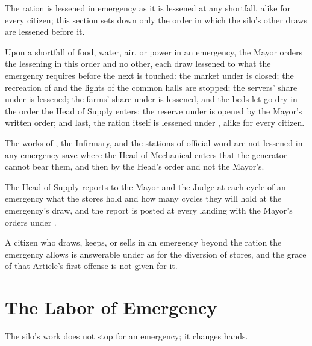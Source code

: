 The ration is lessened in emergency as it is lessened at any shortfall, alike for every citizen; this section sets down only the order in which the silo's other draws are lessened before it.

\begin{clauses}
\item Upon a shortfall of food, water, air, or power in an emergency, the Mayor orders the lessening in this order and no other, each draw lessened to what the emergency requires before the next is touched: the market under  is closed; the recreation of  and the lights of the common halls are stopped; the servers' share under  is lessened; the farms' share under  is lessened, and the beds let go dry in the order the Head of Supply enters; the reserve under  is opened by the Mayor's written order; and last, the ration itself is lessened under , alike for every citizen.
\item The works of , the Infirmary, and the stations of official word are not lessened in any emergency save where the Head of Mechanical enters that the generator cannot bear them, and then by the Head's order and not the Mayor's.
\item The Head of Supply reports to the Mayor and the Judge at each cycle of an emergency what the stores hold and how many cycles they will hold at the emergency's draw, and the report is posted at every landing with the Mayor's orders under .
\item A citizen who draws, keeps, or sells in an emergency beyond the ration the emergency allows is answerable under  as for the diversion of stores, and the grace of that Article's first offense is not given for it.
\end{clauses}

\section{The Labor of Emergency}
\label{sec:emergency:labor-of-emergency}

The silo's work does not stop for an emergency; it changes hands.


